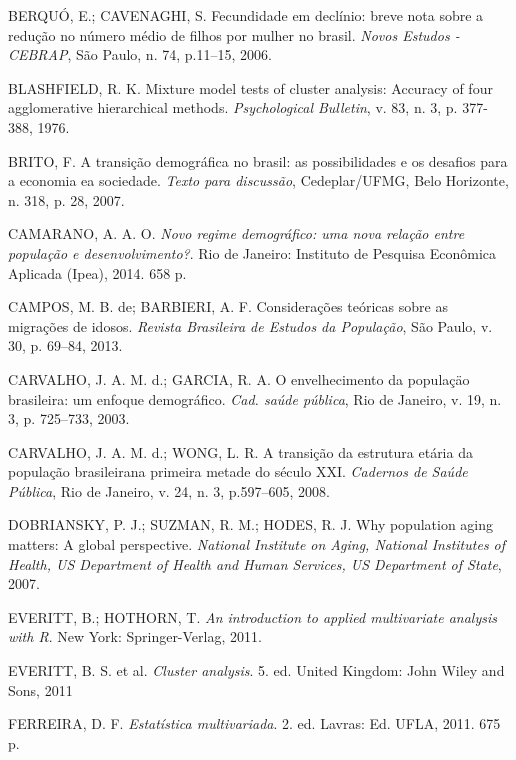 \documentclass[10pt,twoside]{article}
\begin{document}
	
	\begin{thebibliography}{}
		
		\bibitem[]{}
		
		
		
		BERQUÓ, E.; CAVENAGHI, S. Fecundidade em declínio:  breve nota sobre a redução no número médio de filhos por mulher no brasil. \textit{Novos Estudos - CEBRAP}, São Paulo, n. 74, p.11–15, 2006.
			
		BLASHFIELD, R. K. Mixture model tests of cluster analysis: Accuracy of four agglomerative hierarchical methods. \textit{Psychological Bulletin}, v. 83, n. 3, p. 377-388, 1976.
		
		BRITO, F. A transição demográfica no brasil: as possibilidades e os desafios para a economia ea sociedade. \textit{Texto para discussão}, Cedeplar/UFMG, Belo Horizonte, n. 318, p. 28, 2007.
		
		CAMARANO, A. A. O. \textit{Novo regime demográfico: uma nova relação entre população e desenvolvimento?}. Rio de Janeiro: Instituto de Pesquisa Econômica Aplicada (Ipea), 2014. 658 p.
		
		CAMPOS, M. B. de; BARBIERI, A. F. Considerações teóricas sobre as migrações de idosos. \textit{Revista Brasileira de Estudos da População}, São Paulo, v. 30, p. 69–84, 2013.
		
		CARVALHO, J. A. M. d.; GARCIA, R. A. O envelhecimento da populaçäo brasileira:  um enfoque demográfico. \textit{Cad. saúde pública}, Rio de Janeiro, v. 19, n. 3, p. 725–733, 2003.
		
		CARVALHO, J. A. M. d.; WONG, L. R. A transição da estrutura etária da população brasileirana primeira metade do século XXI. \textit{Cadernos de Saúde Pública}, Rio de Janeiro, v. 24, n. 3, p.597–605, 2008.
		
		DOBRIANSKY, P. J.; SUZMAN, R. M.; HODES, R. J. Why population aging matters: A global perspective. \textit{National Institute on Aging, National Institutes of Health, US Department of Health and Human Services, US Department of State}, 2007.
		
		EVERITT, B.; HOTHORN, T. \textit{An introduction to applied multivariate analysis with R}. New York: Springer-Verlag, 2011.
		
		EVERITT, B. S. et al. \textit{Cluster analysis}. 5. ed. United Kingdom: John Wiley and Sons, 2011
		
		FERREIRA, D. F. \textit{Estatística multivariada}. 2. ed. Lavras: Ed. UFLA, 2011. 675 p.
		

\end{thebibliography}
\end{document}
